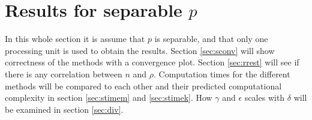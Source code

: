\chapter{Results for separable $p$} \label{seri}%
In this whole section it is assume that $p$ is separable, and that only one processing unit is used to obtain the results. 
Section \ref{sec:sconv} will show correctness of the methods with a convergence plot. Section \ref{sec:rrest} will see if there is any correlation between $n$ and $\rho$.
Computation times for the different methods will be compared to each other and their predicted computational complexity in section \ref{sec:stimem} and \ref{sec:stimek}.
How $\gamma$ and $\epsilon$ scales with $\delta$ will be examined in section \ref{sec:div}.
